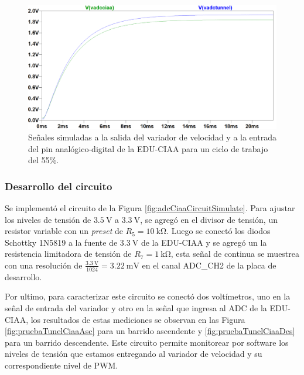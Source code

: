 \begin{figure}[H]
    \centering
    \includegraphics[width=1\linewidth]{Figuras/datalogger/Hardware/adc55PercentPwm.png}
    \caption{Señales simuladas a la salida del variador de velocidad y a la entrada del pin analógico-digital de la EDU-CIAA para un ciclo de trabajo del 55\%.}
    \label{fig:adc55PercentPwm}
\end{figure}

\subsubsection{Desarrollo del circuito}

Se implementó el circuito de la Figura \ref{fig:adcCiaaCircuitSimulate}. Para ajustar los niveles de tensión de $\SI{3.5}{\volt}$ a $\SI{3.3}{\volt}$, se agregó en el divisor de tensión, un resistor variable con un \textit{preset} de $R_{5} = \SI{10}{\kilo\ohm}$. Luego se conectó los diodos Schottky 1N5819 \cite{1N5819_datasheet} a la fuente de $\SI{3.3}{\volt}$ de la EDU-CIAA y se agregó un la resistencia limitadora de tensión de $R_{7} = \SI{1}{\kilo\ohm}$, esta señal de continua se muestrea con una resolución  de $\frac{\SI{3.3}{\volt}}{1024} = \SI{3.22}{\milli\volt}$  en el canal ADC\_CH2 de la placa de desarrollo.


Por ultimo, para caracterizar este circuito se conectó dos voltímetros, uno en la señal de entrada del variador y otro en la señal que ingresa al ADC de la EDU-CIAA, los resultados de estas mediciones se observan en las Figura \ref{fig:pruebaTunelCiaaAsc} para un barrido ascendente y \ref{fig:pruebaTunelCiaaDes} para un barrido descendente. Este circuito permite monitorear por software los niveles de tensión que estamos entregando al variador de velocidad y su correspondiente nivel de PWM.


